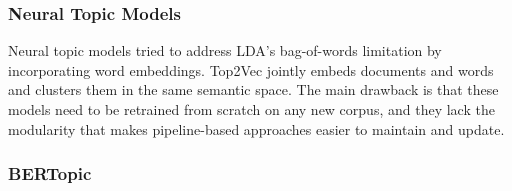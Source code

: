 \subsubsection{Neural Topic Models}
\begin{justify}
Neural topic models tried to address LDA's bag-of-words limitation by incorporating word embeddings. Top2Vec \cite{angelov2020top2vec} jointly embeds documents and words and clusters them in the same semantic space. The main drawback is that these models need to be retrained from scratch on any new corpus, and they lack the modularity that makes pipeline-based approaches easier to maintain and update.
\end{justify}

\subsubsection{BERTopic}
